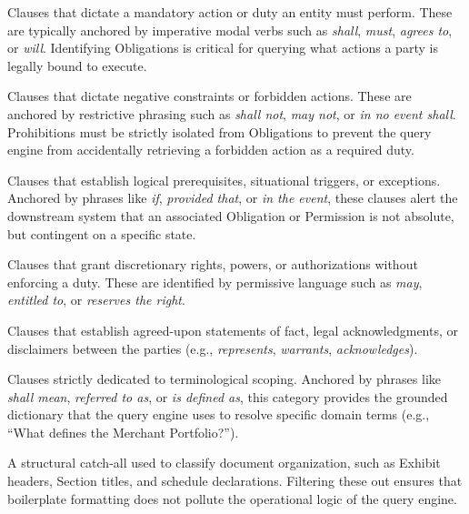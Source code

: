 \documentclass[twoside,final]{hcmut-report}
\begin{document}
\begin{description}[leftmargin=2cm, style=nextline]
  \item[Obligation:] Clauses that dictate a mandatory action or duty an entity must perform. These are typically anchored by imperative modal verbs such as \textit{shall}, \textit{must}, \textit{agrees to}, or \textit{will}. Identifying Obligations is critical for querying what actions a party is legally bound to execute.

  \item[Prohibition:] Clauses that dictate negative constraints or forbidden actions. These are anchored by restrictive phrasing such as \textit{shall not}, \textit{may not}, or \textit{in no event shall}. Prohibitions must be strictly isolated from Obligations to prevent the query engine from accidentally retrieving a forbidden action as a required duty.

  \item[Condition:] Clauses that establish logical prerequisites, situational triggers, or exceptions. Anchored by phrases like \textit{if}, \textit{provided that}, or \textit{in the event}, these clauses alert the downstream system that an associated Obligation or Permission is not absolute, but contingent on a specific state.

  \item[Permission:] Clauses that grant discretionary rights, powers, or authorizations without enforcing a duty. These are identified by permissive language such as \textit{may}, \textit{entitled to}, or \textit{reserves the right}.

  \item[Representation/Warranty:] Clauses that establish agreed-upon statements of fact, legal acknowledgments, or disclaimers between the parties (e.g., \textit{represents}, \textit{warrants}, \textit{acknowledges}).

  \item[Definition:] Clauses strictly dedicated to terminological scoping. Anchored by phrases like \textit{shall mean}, \textit{referred to as}, or \textit{is defined as}, this category provides the grounded dictionary that the query engine uses to resolve specific domain terms (e.g., ``What defines the Merchant Portfolio?'').

  \item[Scope/Structure:] A structural catch-all used to classify document organization, such as Exhibit headers, Section titles, and schedule declarations. Filtering these out ensures that boilerplate formatting does not pollute the operational logic of the query engine.
\end{description}
\end{document}
